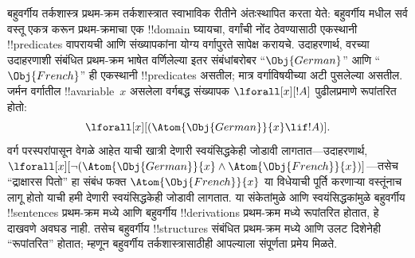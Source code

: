 \documentclass[../../../include/open-logic-section]{subfiles}
\begin{document}
बहुवर्गीय तर्कशास्त्र प्रथम-क्रम तर्कशास्त्रात स्वाभाविक रीतीने अंतःस्थापित
करता येते: बहुवर्गीय मधील सर्व वस्तू एकत्र करून प्रथम-क्रमाचा एक
!!{domain} घ्यायचा, वर्गांची नोंद ठेवण्यासाठी एकस्थानी !!{predicate}s
वापरायची आणि संख्यापकांना योग्य वर्गापुरते सापेक्ष करायचे. उदाहरणार्थ, वरच्या
उदाहरणाशी संबंधित प्रथम-क्रम भाषेत वर्णिलेल्या इतर संबंधांबरोबर
``$\Obj{German}$'' आणि ``$\Obj{French}$'' ही एकस्थानी !!{predicate}s असतील;
मात्र वर्गाविषयीच्या अटी पुसलेल्या असतील. जर्मन वर्गातील !!a{variable}~$x$
असलेला वर्गबद्ध संख्यापक $\lforall[x][!A]$ पुढीलप्रमाणे रूपांतरित होतो:
\[
\lforall[x][(\Atom{\Obj{German}}{x} \lif !A)].
\]
वर्ग परस्परांपासून वेगळे आहेत याची खात्री देणारी स्वयंसिद्धकेही जोडावी
लागतात---उदाहरणार्थ,
$\lforall[x][\lnot (\Atom{\Obj{German}}{x} \land
  \Atom{\Obj{French}}{x})]$---तसेच ``द्राक्षारस पितो'' हा संबंध फक्त
$\Atom{\Obj{French}}{x}$ या विधेयाची पूर्ति करणाऱ्या वस्तूंनाच लागू होतो
याची हमी देणारी स्वयंसिद्धकेही जोडावी लागतात. या संकेतांमुळे आणि
स्वयंसिद्धकांमुळे बहुवर्गीय !!{sentence}s प्रथम-क्रम मध्ये आणि
बहुवर्गीय !!{derivation}s प्रथम-क्रम मध्ये रूपांतरित होतात,
हे दाखवणे अवघड नाही. तसेच बहुवर्गीय !!{structure}s संबंधित प्रथम-क्रम
मध्ये आणि उलट दिशेनेही ``रूपांतरित'' होतात; म्हणून बहुवर्गीय
तर्कशास्त्रासाठीही आपल्याला संपूर्णता प्रमेय मिळते.
\end{document}

